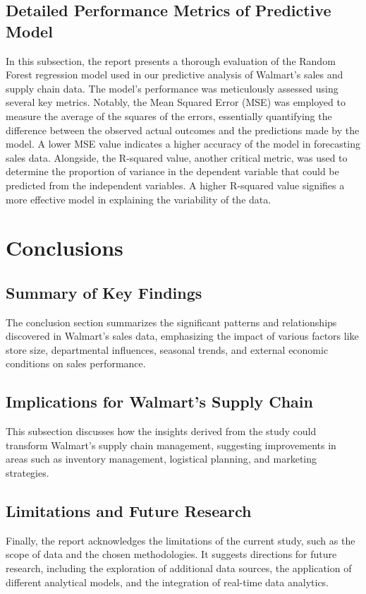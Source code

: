 \documentclass[conference]{IEEEtran}
\begin{document}
\subsection{Detailed Performance Metrics of Predictive Model}
In this subsection, the report presents a thorough evaluation of the Random Forest regression model used in our predictive analysis of Walmart's sales and supply chain data. The model's performance was meticulously assessed using several key metrics. Notably, the Mean Squared Error (MSE) was employed to measure the average of the squares of the errors, essentially quantifying the difference between the observed actual outcomes and the predictions made by the model. A lower MSE value indicates a higher accuracy of the model in forecasting sales data. Alongside, the R-squared value, another critical metric, was used to determine the proportion of variance in the dependent variable that could be predicted from the independent variables. A higher R-squared value signifies a more effective model in explaining the variability of the data.

\section{Conclusions}
\subsection{Summary of Key Findings}
The conclusion section summarizes the significant patterns and relationships discovered in Walmart's sales data, emphasizing the impact of various factors like store size, departmental influences, seasonal trends, and external economic conditions on sales performance.

\subsection{Implications for Walmart's Supply Chain}
This subsection discusses how the insights derived from the study could transform Walmart's supply chain management, suggesting improvements in areas such as inventory management, logistical planning, and marketing strategies.

\subsection{Limitations and Future Research}
Finally, the report acknowledges the limitations of the current study, such as the scope of data and the chosen methodologies. It suggests directions for future research, including the exploration of additional data sources, the application of different analytical models, and the integration of real-time data analytics.
\end{document}

